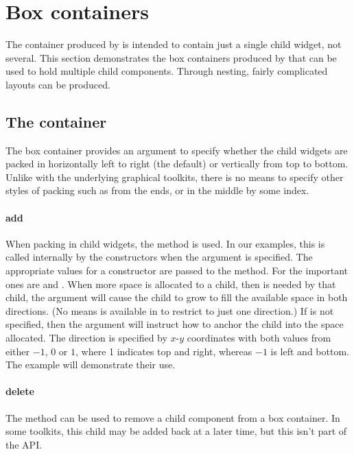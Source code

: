\section{Box containers}
\label{sec:gWidgets-box-containers}

The container produced by  is intended to contain
just a single child widget, not several. This section demonstrates the
box containers produced by  that can be used to
hold multiple child components. Through nesting, fairly complicated
layouts can be produced.

\subsection{The  container}
\label{sec:gWidgets-ggroup-container}
  
The  box container provides an argument
 to specify whether the child widgets
are packed in horizontally left to right (the default) or vertically
from top to bottom. Unlike with the underlying graphical toolkits,
there is no means to specify other styles of packing such as from the
ends, or in the middle by some index.

\paragraph{add}
When packing in child widgets, the  method is
used. In our examples, this is called internally by the constructors
when the  argument is specified. The appropriate
  values for a constructor are passed to the 
method. For  the important ones are 
and . When more space is allocated to a child, then is
needed by that child, the  argument will cause the
child to grow to fill the available space in both directions. (No
means is available in  to restrict to just one
direction.) If  is not specified, then the
 argument will instruct how to anchor the child into the
space allocated. The direction is specified by $x$-$y$ coordinates
with both values from either $-1$, 0 or $1$, where 1 indicates top and
right, whereas $-1$ is left and bottom. The example will demonstrate
their use.

\paragraph{delete}
The  method can be used to remove a child component from a box container. In some toolkits, this child may be added back at a later time, but this isn't part of the API.

